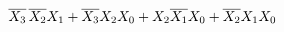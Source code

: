 \documentclass[preview]{standalone}
\begin{document}
\begin{align*}
\overline{X_3}\nobreak\hspace{.16667em plus .08333em}\overline{X_2}X_1+\overline{X_3}X_2X_0+X_2\overline{X_1}X_0+\overline{X_2}X_1X_0
\end{align*}
\end{document}
